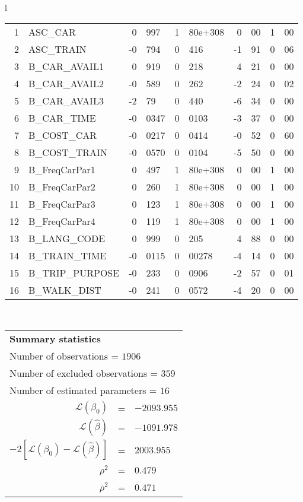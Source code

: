 \begin{tabular}{l}
\begin{tabular}{rlr@{.}lr@{.}lr@{.}lr@{.}l}
1 & ASC_CAR & 0&997 & 1&80e+308 & 0&00 & 1&00\\
2 & ASC_TRAIN & -0&794 & 0&416 & -1&91 & 0&06\\
3 & B_CAR_AVAIL1 & 0&919 & 0&218 & 4&21 & 0&00\\
4 & B_CAR_AVAIL2 & -0&589 & 0&262 & -2&24 & 0&02\\
5 & B_CAR_AVAIL3 & -2&79 & 0&440 & -6&34 & 0&00\\
6 & B_CAR_TIME & -0&0347 & 0&0103 & -3&37 & 0&00\\
7 & B_COST_CAR & -0&0217 & 0&0414 & -0&52 & 0&60\\
8 & B_COST_TRAIN & -0&0570 & 0&0104 & -5&50 & 0&00\\
9 & B_FreqCarPar1 & 0&497 & 1&80e+308 & 0&00 & 1&00\\
10 & B_FreqCarPar2 & 0&260 & 1&80e+308 & 0&00 & 1&00\\
11 & B_FreqCarPar3 & 0&123 & 1&80e+308 & 0&00 & 1&00\\
12 & B_FreqCarPar4 & 0&119 & 1&80e+308 & 0&00 & 1&00\\
13 & B_LANG_CODE & 0&999 & 0&205 & 4&88 & 0&00\\
14 & B_TRAIN_TIME & -0&0115 & 0&00278 & -4&14 & 0&00\\
15 & B_TRIP_PURPOSE & -0&233 & 0&0906 & -2&57 & 0&01\\
16 & B_WALK_DIST & -0&241 & 0&0572 & -4&20 & 0&00\\
\hline
\end{tabular}
\\
\begin{tabular}{rcl}
\multicolumn{3}{l}{\bf Summary statistics}\\
\multicolumn{3}{l}{ Number of observations = $1906$} \\
\multicolumn{3}{l}{ Number of excluded observations = $359$} \\
\multicolumn{3}{l}{ Number of estimated  parameters = $16$} \\
 $\mathcal{L}(\beta_0)$ &=&  $-2093.955$ \\
 $\mathcal{L}(\hat{\beta})$ &=& $-1091.978 $  \\
 $-2[\mathcal{L}(\beta_0) -\mathcal{L}(\hat{\beta})]$ &=& $2003.955$ \\
    $\rho^2$ &=&   $0.479$ \\
    $\bar{\rho}^2$ &=&    $0.471$ \\
\end{tabular}
  \end{tabular}

